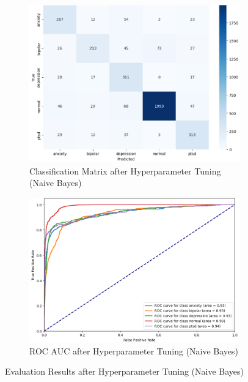 \begin{figure}[h!]
    \centering
    \begin{subfigure}[b]{0.49\textwidth}
        \centering
        \includegraphics[width=\textwidth]{Images/HP NB CM.png}
        \caption{Classification Matrix after Hyperparameter Tuning (Naive Bayes)}
        \label{LSTMROC7}  %
    \end{subfigure}
    \hfill
    \begin{subfigure}[b]{0.49\textwidth}
        \centering
        \includegraphics[width=\textwidth]{Images/HP NB ROC.png}
        \caption{ROC AUC after Hyperparameter Tuning (Naive Bayes)}
        \label{LSTMROC8}  %
    \end{subfigure}
    \caption{Evaluation Results after Hyperparameter Tuning (Naive Bayes)}
    \label{fig:hp_nb_comparison}
\end{figure}

